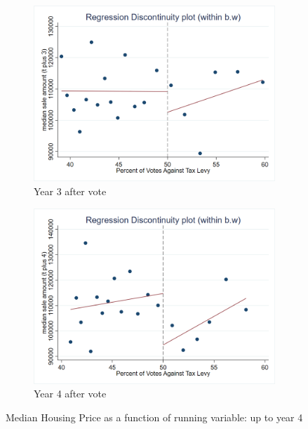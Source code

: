 \begin{figure}[ht]
    \vspace{1em}

    \begin{minipage}[b]{0.48\textwidth}
        \centering
        \begin{subfigure}[b]{\textwidth}
            \centering
            \includegraphics[width=\textwidth,keepaspectratio]{images/rd_plot_median_sale_amount_t_plus_3_tri_mserd_1_2_within.png}
            \caption{Year 3 after vote}
            \label{fig:hp_year3_after}
        \end{subfigure}
    \end{minipage}
    \hfill
    \begin{minipage}[b]{0.48\textwidth}
        \centering
        \begin{subfigure}[b]{\textwidth}
            \centering
            \includegraphics[width=\textwidth,keepaspectratio]{images/rd_plot_median_sale_amount_t_plus_4_tri_mserd_1_2_within.png}
            \caption{Year 4 after vote}
            \label{fig:hp_year4_after}
        \end{subfigure}
    \end{minipage}
    \caption{Median Housing Price as a function of running variable: up to year 4}
    \label{fig:rd_hp_1}
\end{figure}

